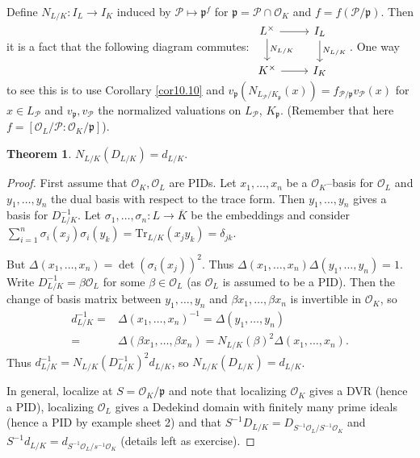 \documentclass{article}
\theoremstyle{definition}
\newtheorem{theorem}{Theorem}[section]
\begin{document}
Define $N_{L/K}: I_L \to I_K$ induced by $\mathcal{P} \mapsto \mathfrak{p}^f$ for $\mathfrak{p} = \mathcal{P} \cap \mathcal{O}_K$ and $f = f(\mathcal{P}/\mathfrak{p})$. Then it is a fact that the following diagram commutes: $\begin{tikzcd}[]
    L^{\times} & I_L\\
    K^{\times} & I_K
    \arrow["", from=1-1, to=1-2]
    \arrow["N_{L/K}", from=1-2, to=2-2]
    \arrow["N_{L/K}", from=1-1, to=2-1]
    \arrow["", from=2-1, to=2-2]
\end{tikzcd}$.
One way to see this is to use Corollary \ref{cor10.10} and $v_{\mathfrak{p}}(N_{L_\mathcal{P}/K_{\mathfrak{p}}}(x)) = f_{\mathcal{P}/\mathfrak{p}} v_{\mathcal{P}}(x)$ for $x \in L_{\mathcal{P}}$ and $v_\mathfrak{p}, v_\mathcal{P}$ the normalized valuations on $L_{\mathcal{P}}$, $K_{\mathfrak{p}}$. (Remember that here $f = [\mathcal{O}_L/\mathcal{P} : \mathcal{O}_K/\mathfrak{p}]$).

\begin{theorem}
    $N_{L/K}(D_{L/K}) = d_{L/K}$.
\end{theorem}
\begin{proof}
    First assume that $\mathcal{O}_K, \mathcal{O}_L$ are PIDs. Let $x_1,\ldots,x_n$ be a $\mathcal{O}_K$--basis for $\mathcal{O}_L$ and $y_1,\ldots,y_n$ the dual basis with respect to the trace form. Then $y_1,\ldots,y_n$ gives a basis for $D^{-1}_{L/K}$. Let $\sigma_1,\ldots,\sigma_n : L \to \overline{K}$ be the embeddings and consider $\sum_{i=1}^{n} \sigma_i(x_j)\sigma_i(y_k) = \text{Tr}_{L/K}(x_j y_k) = \delta_{jk}$.
    \vspace{1mm}
     
    But $\Delta(x_1,\ldots,x_n) = \det(\sigma_i(x_j))^2$. Thus $\Delta(x_1,\ldots,x_n)\Delta(y_1,\ldots,y_n) = 1$. Write $D^{-1}_{L/K} = \beta \mathcal{O}_L$ for some $\beta \in \mathcal{O}_L$ (as $\mathcal{O}_L$ is assumed to be a PID). Then the change of basis matrix between $y_1,\ldots,y_n$ and $\beta x_1, \ldots, \beta x_n$ is invertible in $\mathcal{O}_K$, so
    \begin{align*}
        d^{-1}_{L/K} =& \Delta(x_1,\ldots,x_n)^{-1} = \Delta(y_1,\ldots,y_n) \\
        =& \Delta(\beta x_1, \ldots, \beta x_n) = N_{L/K}(\beta)^2 \Delta(x_1,\ldots,x_n).
    \end{align*}
    Thus $d_{L/K}^{-1} = N_{L/K}(D_{L/K}^{-1})^2 d_{L/K}$, so $N_{L/K}(D_{L/K})=d_{L/K}$.
    \vspace{1mm}
     
    In general, localize at $S = \mathcal{O}_K/\mathfrak{p}$ and note that localizing $\mathcal{O}_K$ gives a DVR (hence a PID), localizing $\mathcal{O}_L$ gives a Dedekind domain with finitely many prime ideals (hence a PID by example sheet 2) and that $S^{-1}D_{L/K} = D_{S^{-1}\mathcal{O}_L/S^{-1}\mathcal{O}_K}$ and $S^{-1} d_{L/K} = d_{S^{-1} \mathcal{O}_L/s^{-1} \mathcal{O}_K}$ (details left as exercise).
\end{proof}
\end{document}
